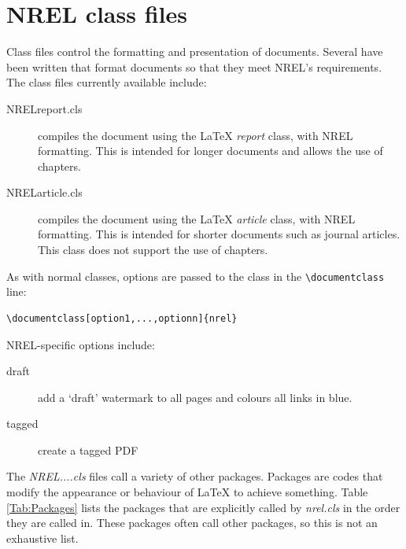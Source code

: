 \section{NREL class files}\label{sec:nrelcls}
Class files control the formatting and presentation of documents. Several have been written that format documents so that they meet NREL's requirements. The class files currently available include:
\begin{description}
\item[NRELreport.cls]{compiles the document using the LaTeX \emph{report} class, with NREL formatting. This is intended for longer documents and allows the use of chapters.}
\item[NRELarticle.cls] compiles the document using the LaTeX \emph{article} class, with NREL formatting. This is intended for shorter documents such as journal articles. This class does not support the use of chapters.
\end{description}

As with normal classes, options are passed to the class in the \verb+\documentclass+ line:

\begin{lstlisting}
\documentclass[option1,...,optionn]{nrel}
\end{lstlisting}

NREL-specific options include:
\begin{description}
\item[draft]{add a `draft' watermark to all pages and colours all links in blue.}
\item[tagged]{create a tagged PDF}
\end{description}

The \emph{NREL....cls} files call a variety of other packages. Packages are codes that modify the appearance or behaviour of LaTeX to achieve something. Table \ref{Tab:Packages} lists the packages that are explicitly called by \emph{nrel.cls} in the order they are called in. These packages often call other packages, so this is not an exhaustive list.

